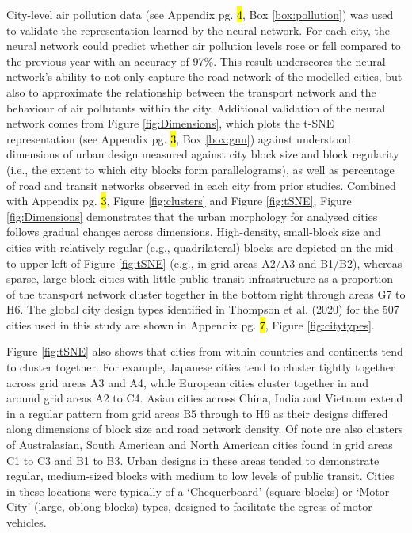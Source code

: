 \documentclass[preprint,10pt]{elsarticle} %
\begin{document}
City-level air pollution data (see Appendix pg. \hl{4}, Box \ref{box:pollution}) was used to validate the representation learned by the neural network. For each city, the neural network could predict whether air pollution levels rose or fell compared to the previous year with an accuracy of 97\%. This result underscores the neural network's ability to not only capture the road network of the modelled cities, but also to approximate the relationship between the transport network and the behaviour of air pollutants within the city. Additional validation of the neural network comes from Figure \ref{fig:Dimensions}, which plots the t-SNE representation (see Appendix pg. \hl{3}, Box \ref{box:gnn}) against understood dimensions of urban design measured against city block size and block regularity (i.e., the extent to which city blocks form parallelograms), as well as percentage of road and transit networks observed in each city from prior studies\cite{Thompson2020,Nice2019b}. Combined with Appendix pg. \hl{3}, Figure \ref{fig:clusters} and Figure \ref{fig:tSNE}, Figure \ref{fig:Dimensions} demonstrates that the urban morphology for analysed cities follows gradual changes across dimensions. High-density, small-block size and cities with relatively regular (e.g., quadrilateral) blocks are depicted on the mid- to upper-left of Figure \ref{fig:tSNE} (e.g., in grid areas A2/A3 and B1/B2), whereas sparse, large-block cities with little public transit infrastructure as a proportion of the transport network cluster together in the bottom right through areas G7 to H6. The global city design types identified in Thompson et al. (2020)\cite{Thompson2020} for the 507 cities used in this study are shown in Appendix pg. \hl{7}, Figure \ref{fig:citytypes}.

Figure \ref{fig:tSNE} also shows that cities from within countries and continents tend to cluster together. For example, Japanese cities tend to cluster tightly together across grid areas A3 and A4, while European cities cluster together in and around grid areas A2 to C4. Asian cities across China, India and Vietnam extend in a regular pattern from grid areas B5 through to H6 as their designs differed along dimensions of block size and road network density. Of note are also clusters of Australasian, South American and North American cities found in grid areas C1 to C3 and B1 to B3. Urban designs in these areas tended to demonstrate regular, medium-sized blocks with medium to low levels of public transit. Cities in these locations were typically of a `Chequerboard' (square blocks) or `Motor City' (large, oblong blocks) types, designed to facilitate the egress of motor vehicles.
\end{document}
